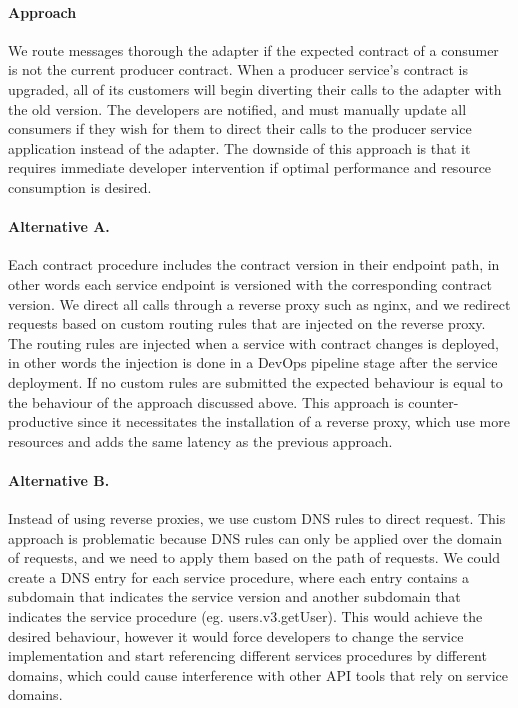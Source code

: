 \paragraph{Approach}
We route messages thorough the adapter if the expected contract of a consumer is not the current producer contract.
When a producer service's contract is upgraded, all of its customers will begin diverting their calls to the adapter with the old version.
The developers are notified, and must manually update all consumers if they wish for them to direct their calls to the producer service application instead of the adapter.
The downside of this approach is that it requires immediate developer intervention if optimal performance and resource consumption is desired.

\paragraph{Alternative A.}
Each contract procedure includes the contract version in their endpoint path, in other words each service endpoint is versioned with the corresponding contract version.
We direct all calls through a reverse proxy such as nginx, and we redirect requests based on custom routing rules that are injected on the reverse proxy.
The routing rules are injected when a service with contract changes is deployed, in other words the injection is done in a DevOps pipeline stage after the service deployment.
If no custom rules are submitted the expected behaviour is equal to the behaviour of the approach discussed above.
This approach is counter-productive since it necessitates the installation of a reverse proxy, which use more resources and adds the same latency as the previous approach.

\paragraph{Alternative B.}
Instead of using reverse proxies, we use custom DNS rules to direct request.
This approach is problematic because DNS rules can only be applied over the domain of requests, and we need to apply them based on the path of requests.
We could create a DNS entry for each service procedure,
where each entry contains a subdomain that indicates the service version and another subdomain that indicates the service procedure (eg. users.v3.getUser).
This would achieve the desired behaviour,
however it would force developers to change the service implementation and start referencing different services procedures by different domains, which could cause interference
with other API tools that rely on service domains.

